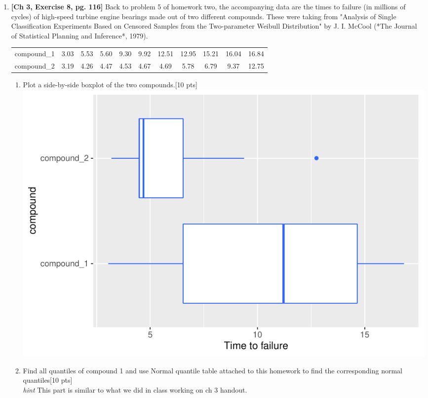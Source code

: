 \documentclass[11pt]{article}\usepackage[]{graphicx}\usepackage[]{color}
\begin{document}
\begin{enumerate}
\item \textbf{[Ch 3, Exercise 8, pg. 116]} Back to problem 5 of homework two,  the accompanying data are the times to failure (in millions of cycles) of high-speed turbine engine bearings made out of two different compounds. These were taking from "Analysis of Single Classification Experiments Based on Censored Samples from the Two-parameter Weibull Distribution" by J. I. McCool (*The Journal of Statistical Planning and Inference*, 1979).
    

\begin{center}
	\begin{tabular}{|ccccccccccc|}	
		\hline
		compound_1  & 3.03 & 5.53 & 5.60 & 9.30 & 9.92 & 12.51 & 12.95 & 15.21 & 16.04 & 16.84\\
		compound_2 & 3.19 & 4.26 & 4.47 & 4.53 & 4.67 & 4.69 & 5.78 & 6.79 & 9.37 & 12.75\\
		\hline
	\hline                 
	\end{tabular}
\end{center}

\begin{enumerate}
    \item Plot a side-by-side boxplot of the two compounds.[10 pts]\\
\includegraphics{stat305-hw3_s20_sol-001}
    
    
    \item Find all quantiles of compound 1 and use Normal quantile table attached to this homework to find the corresponding normal quantiles[10 pts]\\
    

    \emph{hint} This part is similar to what we did in class working on ch 3 handout. \\


\end{enumerate}
\end{enumerate}
\end{document}
